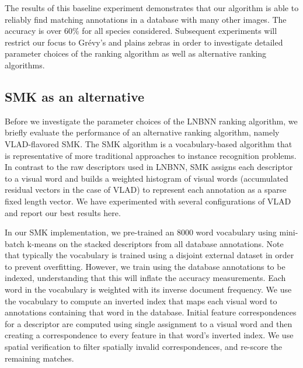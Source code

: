         The results of this baseline experiment demonstrates that our algorithm is able to reliably find matching
        annotations in a database with many other images. The accuracy is over $60\percent$ for all species
        considered. Subsequent experiments will restrict our focus to Grévy's and plains zebras in order to
        investigate detailed parameter choices of the ranking algorithm as well as alternative ranking algorithms.
      
        \BaselineExpt{}

    \FloatBarrier{}
    \subsection{SMK as an alternative}\label{sub:exptsmk}  

        Before we investigate the parameter choices of the LNBNN ranking algorithm, we briefly evaluate the
        performance of an alternative ranking algorithm, namely VLAD-flavored SMK. The SMK algorithm is a
        vocabulary-based algorithm that is representative of more traditional approaches to instance recognition
        problems. In contrast to the raw descriptors used in LNBNN, SMK assigns each descriptor to a visual word
        and builds a weighted histogram of visual words (accumulated residual vectors in the case of VLAD) to
        represent each annotation as a sparse fixed length vector. We have experimented with several configurations
        of VLAD and report our best results here.

        In our SMK implementation, we pre-trained an $8000$ word vocabulary using mini-batch k-means on the stacked
        descriptors from all database annotations. Note that typically the vocabulary is trained using a disjoint
        external dataset in order to prevent overfitting. However, we \naively{} train using the database
        annotations to be indexed, understanding that this will inflate the accuracy measurements. Each word in the
        vocabulary is weighted with its inverse document frequency. We use the vocabulary to compute an inverted
        index that maps each visual word to annotations containing that word in the database. Initial feature
        correspondences for a descriptor are computed using single assignment to a visual word and then creating a
        correspondence to every feature in that word's inverted index. We use spatial verification to filter
        spatially invalid correspondences, and re-score the remaining matches.

